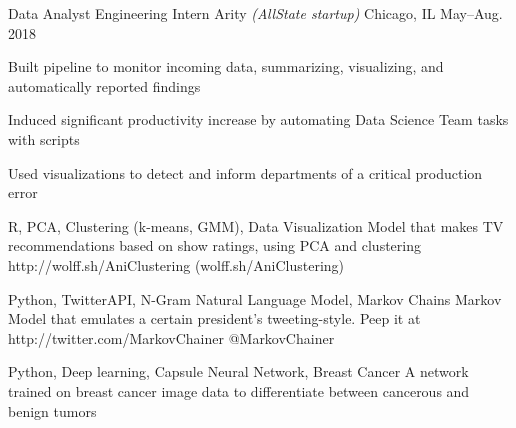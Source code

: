\documentclass[10pt, letterpaper]{awesome-cv}
\begin{document}
\begin{cventries}
    \cventry
        {Data Analyst Engineering Intern}
        {Arity \textit{(AllState startup)}}
        {Chicago, IL}
        {May--Aug. 2018}
        {\begin{cvitems} 
            \item Built pipeline to monitor incoming data, summarizing, visualizing, and automatically reported findings
            \item Induced significant productivity increase by automating Data Science Team tasks with scripts
            \item Used visualizations to detect and inform departments of a critical production error
            \end{cvitems}}
            
\end{cventries}

\begin{projects}
    {R, PCA, Clustering (k-means, GMM), Data Visualization}
    {Model that makes TV recommendations based on show ratings, using PCA and clustering}
    {http://wolff.sh/AniClustering}
    {(wolff.sh/AniClustering)}
    
    {Python, TwitterAPI, N-Gram Natural Language Model, Markov Chains}
    {Markov Model that emulates a certain president's tweeting-style. Peep it at}
    {http://twitter.com/MarkovChainer}
    {@MarkovChainer}
    
    {Python, Deep learning, Capsule Neural Network, Breast Cancer}
    {A network trained on breast cancer image data to differentiate between cancerous and benign tumors}
    {}
    {}
    
    
\end{projects}
    
\end{document}
